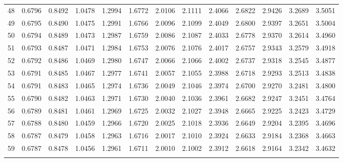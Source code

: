 {\begin{tabular}{m{6pt}|m{24pt}*{11}{m{24pt}}}
 48 & 0.6796 & 0.8492 & 1.0478 & 1.2994 & 1.6772 & 2.0106 & 2.1111 & 2.4066 & 2.6822 & 2.9426 & 3.2689 & 3.5051 \\[1pt] \arrayrulecolor{light-gray}\hline\arrayrulecolor{black}  
 49 & 0.6795 & 0.8490 & 1.0475 & 1.2991 & 1.6766 & 2.0096 & 2.1099 & 2.4049 & 2.6800 & 2.9397 & 3.2651 & 3.5004 \\[1pt] \arrayrulecolor{light-gray}\hline\arrayrulecolor{black}  
 50 & 0.6794 & 0.8489 & 1.0473 & 1.2987 & 1.6759 & 2.0086 & 2.1087 & 2.4033 & 2.6778 & 2.9370 & 3.2614 & 3.4960 \\[1pt] \arrayrulecolor{light-gray}\hline\arrayrulecolor{black}  
 51 & 0.6793 & 0.8487 & 1.0471 & 1.2984 & 1.6753 & 2.0076 & 2.1076 & 2.4017 & 2.6757 & 2.9343 & 3.2579 & 3.4918 \\[1pt] \arrayrulecolor{light-gray}\hline\arrayrulecolor{black}  
 52 & 0.6792 & 0.8486 & 1.0469 & 1.2980 & 1.6747 & 2.0066 & 2.1066 & 2.4002 & 2.6737 & 2.9318 & 3.2545 & 3.4877 \\[1pt] \arrayrulecolor{light-gray}\hline\arrayrulecolor{black}  
 53 & 0.6791 & 0.8485 & 1.0467 & 1.2977 & 1.6741 & 2.0057 & 2.1055 & 2.3988 & 2.6718 & 2.9293 & 3.2513 & 3.4838 \\[1pt] \arrayrulecolor{light-gray}\hline\arrayrulecolor{black}  
 54 & 0.6791 & 0.8483 & 1.0465 & 1.2974 & 1.6736 & 2.0049 & 2.1046 & 2.3974 & 2.6700 & 2.9270 & 3.2481 & 3.4800 \\[1pt] \arrayrulecolor{light-gray}\hline\arrayrulecolor{black}  
 55 & 0.6790 & 0.8482 & 1.0463 & 1.2971 & 1.6730 & 2.0040 & 2.1036 & 2.3961 & 2.6682 & 2.9247 & 3.2451 & 3.4764 \\[1pt] \arrayrulecolor{light-gray}\hline\arrayrulecolor{black}  
 56 & 0.6789 & 0.8481 & 1.0461 & 1.2969 & 1.6725 & 2.0032 & 2.1027 & 2.3948 & 2.6665 & 2.9225 & 3.2423 & 3.4729 \\[1pt] \arrayrulecolor{light-gray}\hline\arrayrulecolor{black}  
 57 & 0.6788 & 0.8480 & 1.0459 & 1.2966 & 1.6720 & 2.0025 & 2.1018 & 2.3936 & 2.6649 & 2.9204 & 3.2395 & 3.4696 \\[1pt] \arrayrulecolor{light-gray}\hline\arrayrulecolor{black}  
 58 & 0.6787 & 0.8479 & 1.0458 & 1.2963 & 1.6716 & 2.0017 & 2.1010 & 2.3924 & 2.6633 & 2.9184 & 3.2368 & 3.4663 \\[1pt] \arrayrulecolor{light-gray}\hline\arrayrulecolor{black}  
 59 & 0.6787 & 0.8478 & 1.0456 & 1.2961 & 1.6711 & 2.0010 & 2.1002 & 2.3912 & 2.6618 & 2.9164 & 3.2342 & 3.4632 \\[1pt] \arrayrulecolor{light-gray}\hline\arrayrulecolor{black}  

\end{tabular}}
